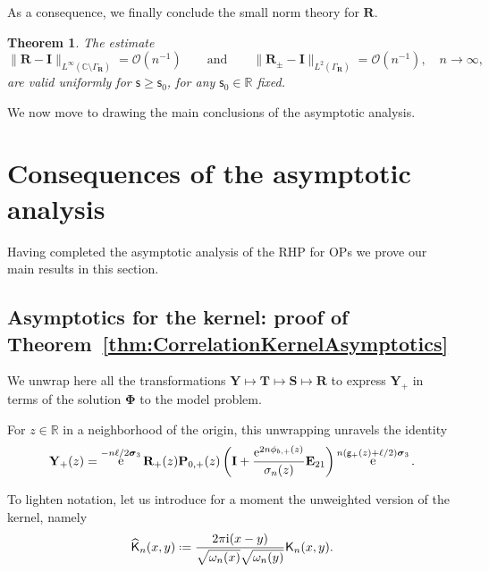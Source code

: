 \documentclass[reqno,a4paper,11pt]{amsart}
\DeclareMathOperator{\ee}{\rm e}
\newcommand{\C}{\mathbb{C}}
\newcommand{\R}{\mathbb{R}}
\newcommand{\Boh}{\mathcal{O}}
\newcommand{\ii}{\mathrm{i}}
\newcommand*{\deff}{\mathrel{\vcenter{\baselineskip0.5ex \lineskiplimit0pt
                     \hbox{\scriptsize.}\hbox{\scriptsize.}}}%
                     =}
\renewcommand{\bm}{\mathbf}
\newcommand{\msf}{\mathsf}
\newcommand{\wh}{\widehat}
\renewcommand{\sp}{\boldsymbol \sigma}
\newcommand{\sad}{\msf s}
\newtheorem{theorem}{Theorem}[section]
\theoremstyle{definition}
\theoremstyle{remark}
\numberwithin{equation}{section}
\begin{document}
As a consequence, we finally conclude the small norm theory for $\bm R$.

\begin{theorem}\label{thm:smallnormROPs}
    The estimate
    $$
    \|\bm R-\bm I\|_{L^\infty(\C\setminus \Gamma_{\bm R})}=\Boh(n^{-1})\qquad \text{and}\qquad \|\bm R_\pm-\bm I\|_{L^2(\Gamma_{\bm R})}=\Boh(n^{-1}),\quad n\to \infty,
    $$
    are valid uniformly for $\sad\geq \sad_0$, for any $\sad_0\in \R$ fixed.
\end{theorem}

We now move to drawing the main conclusions of the asymptotic analysis.

\section{Consequences of the asymptotic analysis}\label{sec:spoils}

Having completed the asymptotic analysis of the RHP for OPs we prove our main results in this section.

\subsection{Asymptotics for the kernel: proof of Theorem~\ref{thm:CorrelationKernelAsymptotics}}\label{sec:KernelAsymptotics}\hfill 

We unwrap here all the transformations $\bm Y\mapsto \bm T\mapsto \bm S\mapsto \bm R$ to express $\bm Y_+$ in terms of the solution $\bm \Phi$ to the model problem.

For $z\in \R$ in a neighborhood of the origin, this unwrapping unravels the identity
%
\begin{equation}\label{eq:unwrapYkernel}
    \bm Y_+(z) 
     =\ee^{-n\ell/2\sp_3}\bm R_+(z)\bm P_{0,+}(z)\left(\bm I+\dfrac{\ee^{2n\phi_{b,+}(z)}}{\sigma_n(z)}\bm E_{21}\right)\ee^{n(\msf g_+(z)+\ell/2)\sp_3}.  
     \end{equation}

To lighten notation, let us introduce for a moment the unweighted version of the kernel, namely
%
\begin{equation}\label{eq:KnhatKn}
\wh{\msf K}_n(x,y)\deff \frac{2\pi \ii (x-y)}{\sqrt{\omega_n(x)}\sqrt{\omega_n(y)}}\msf K_n(x,y).
\end{equation}
%
\end{document}
